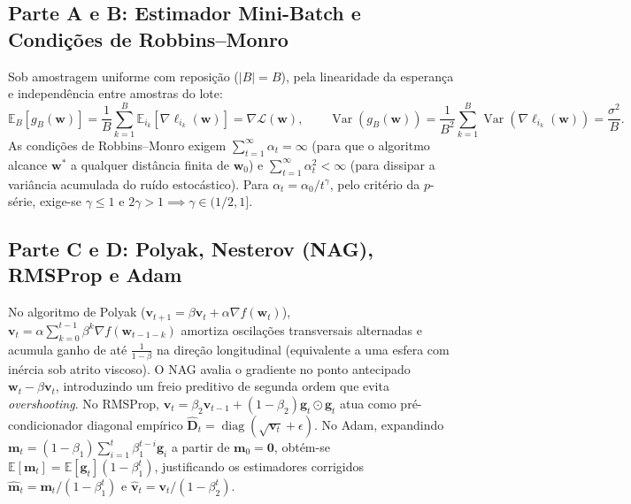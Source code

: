 \documentclass[11pt,a4paper]{article}
\begin{document}
\subsection{Parte A e B: Estimador Mini-Batch e Condições de Robbins--Monro}
Sob amostragem uniforme com reposição ($|B|=B$), pela linearidade da esperança e independência entre amostras do lote:
\[
\mathbb{E}_B[g_B(\mathbf{w})] = \frac{1}{B}\sum_{k=1}^B \mathbb{E}_{i_k}[\nabla\ell_{i_k}(\mathbf{w})] = \nabla\mathcal{L}(\mathbf{w}), \qquad
\operatorname{Var}(g_B(\mathbf{w})) = \frac{1}{B^2}\sum_{k=1}^B \operatorname{Var}(\nabla\ell_{i_k}(\mathbf{w})) = \frac{\sigma^2}{B}.
\]
As condições de Robbins--Monro exigem $\sum_{t=1}^\infty \alpha_t = \infty$ (para que o algoritmo alcance $\mathbf{w}^*$ a qualquer distância finita de $\mathbf{w}_0$) e $\sum_{t=1}^\infty \alpha_t^2 < \infty$ (para dissipar a variância acumulada do ruído estocástico). Para $\alpha_t = \alpha_0 / t^\gamma$, pelo critério da $p$-série, exige-se $\gamma \le 1$ e $2\gamma > 1 \implies \gamma \in (1/2, 1]$.

\subsection{Parte C e D: Polyak, Nesterov (NAG), RMSProp e Adam}
No algoritmo de Polyak ($\mathbf{v}_{t+1} = \beta\mathbf{v}_t + \alpha\nabla f(\mathbf{w}_t)$), $\mathbf{v}_t = \alpha\sum_{k=0}^{t-1}\beta^k\nabla f(\mathbf{w}_{t-1-k})$ amortiza oscilações transversais alternadas e acumula ganho de até $\frac{1}{1-\beta}$ na direção longitudinal (equivalente a uma esfera com inércia sob atrito viscoso). O NAG avalia o gradiente no ponto antecipado $\mathbf{w}_t - \beta\mathbf{v}_t$, introduzindo um freio preditivo de segunda ordem que evita \textit{overshooting}. No RMSProp, $\mathbf{v}_t = \beta_2\mathbf{v}_{t-1} + (1-\beta_2)\mathbf{g}_t\odot\mathbf{g}_t$ atua como pré-condicionador diagonal empírico $\hat{\mathbf{D}}_t = \operatorname{diag}(\sqrt{\mathbf{v}_t}+\epsilon)$. No Adam, expandindo $\mathbf{m}_t = (1-\beta_1)\sum_{i=1}^t \beta_1^{t-i}\mathbf{g}_i$ a partir de $\mathbf{m}_0=\mathbf{0}$, obtém-se $\mathbb{E}[\mathbf{m}_t] = \mathbb{E}[\mathbf{g}_t](1-\beta_1^t)$, justificando os estimadores corrigidos $\hat{\mathbf{m}}_t = \mathbf{m}_t/(1-\beta_1^t)$ e $\hat{\mathbf{v}}_t = \mathbf{v}_t/(1-\beta_2^t)$.
\end{document}
